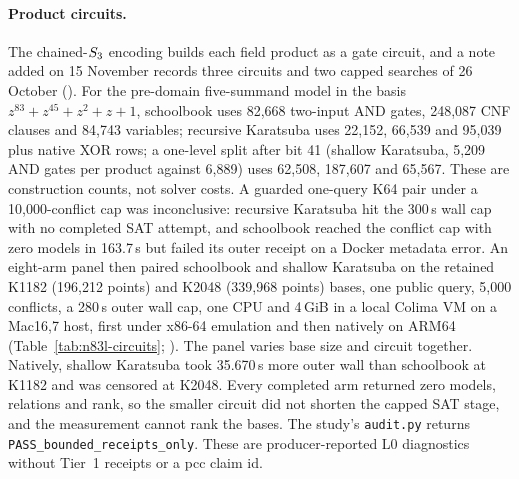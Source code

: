 \paragraph{Product circuits.} The chained-$S_{3}$ encoding builds each
field product as a gate circuit, and a note added on 15 November records
three circuits and two capped searches of 26 October
().
For the pre-domain five-summand model in the basis
$z^{83}+z^{45}+z^2+z+1$, schoolbook uses 82{,}668 two-input AND gates,
248{,}087 CNF clauses and 84{,}743 variables; recursive Karatsuba uses
22{,}152, 66{,}539 and 95{,}039 plus native XOR rows; a one-level split after
bit 41 (shallow Karatsuba, 5{,}209 AND gates per product against 6{,}889)
uses 62{,}508, 187{,}607 and 65{,}567. These are construction counts, not
solver costs. A guarded one-query K64 pair under a 10{,}000-conflict cap was
inconclusive: recursive Karatsuba hit the 300\,s wall cap with no completed SAT
attempt, and schoolbook reached the conflict cap with zero models in
163.7\,s but failed its outer receipt on a Docker metadata error. An
eight-arm panel then paired schoolbook and shallow Karatsuba on the retained
K1182 (196{,}212 points) and K2048 (339{,}968 points) bases, one public query,
5{,}000 conflicts, a 280\,s outer wall cap, one CPU and 4\,GiB in a local
Colima VM on a Mac16,7 host, first under x86-64 emulation and then natively
on ARM64 (Table~\ref{tab:n83l-circuits};
).
The panel varies base size and circuit together. Natively, shallow
Karatsuba took 35.670\,s more outer wall than schoolbook at K1182 and was
censored at K2048. Every completed arm returned zero models, relations and
rank, so the smaller circuit did not shorten the capped SAT stage, and the
measurement cannot rank the bases. The study's \texttt{audit.py} returns
\texttt{PASS\_bounded\_receipts\_only}. These are producer-reported L0
diagnostics without Tier~1 receipts or a pcc claim id.

